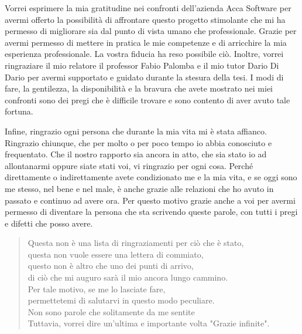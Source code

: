 Vorrei esprimere la mia gratitudine nei confronti dell'azienda Acca Software per avermi offerto la possibilità di affrontare questo progetto stimolante che mi ha permesso di migliorare sia dal punto di vista umano che professionale. Grazie per avermi permesso di mettere in pratica le mie competenze e di arricchire la mia esperienza professionale. La vostra fiducia ha reso possibile ciò. Inoltre, vorrei ringraziare il mio relatore il professor Fabio Palomba e il mio tutor Dario Di Dario per avermi supportato e guidato durante la stesura della tesi. I modi di fare, la gentilezza, la disponibilità e la bravura che avete mostrato nei miei confronti sono dei pregi che è difficile trovare e sono contento di aver avuto tale fortuna.

Infine, ringrazio ogni persona che durante la mia vita mi è stata affianco. Ringrazio chiunque, che per molto o per poco tempo io abbia conosciuto e frequentato. Che il nostro rapporto sia ancora in atto, che sia stato io ad allontanarmi oppure siate stati voi, vi ringrazio per ogni cosa. Perché direttamente o indirettamente avete condizionato me e la mia vita, e se oggi sono me stesso, nel bene e nel male, è anche grazie alle relazioni che ho avuto in passato e continuo ad avere ora. Per questo motivo grazie anche a voi per avermi permesso di diventare la persona che sta scrivendo queste parole, con tutti i pregi e difetti che posso avere.

\begin{verse}
Questa non è una lista di ringraziamenti per ciò che è stato,\\
questa non vuole essere una lettera di commiato,\\
questo non è altro che uno dei punti di arrivo,\\
di ciò che mi auguro sarà il mio ancora lungo cammino.\\
Per tale motivo, se me lo lasciate fare,\\
permettetemi di salutarvi in questo modo peculiare.\\
Non sono parole che solitamente da me sentite\\
Tuttavia, vorrei dire un'ultima e importante volta "Grazie infinite".
\end{verse}